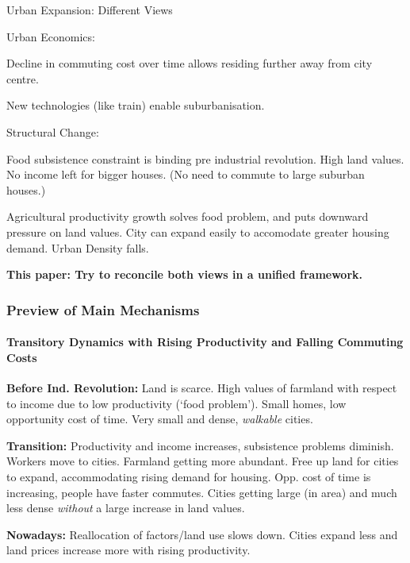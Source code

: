 \documentclass[aspectratio=169]{beamer}
\begin{document}
\begin{frame}{Urban Expansion: Different Views}

\begin{widee}

\item Urban Economics:
\begin{midi}
\item Decline in commuting cost over time allows residing further away from city centre.
\item New technologies (like train) enable suburbanisation.
\end{midi}

\pause

\item Structural Change: 
\begin{midi}
\item Food subsistence constraint is binding pre industrial revolution. High land values. No income left for bigger houses. (No need to commute to large suburban houses.)
\item Agricultural productivity growth solves food problem, and puts downward pressure on land values. City can expand easily to accomodate greater housing demand. Urban Density falls.
\end{midi}
\end{widee}

\pause

\begin{center}
	\textbf{This paper: Try to reconcile both views in a unified framework.}
\end{center}

\end{frame}

\begin{v75mins}
\begin{frame}
\frametitle{Preview of Main Mechanisms}
\framesubtitle{Transitory Dynamics with Rising Productivity and Falling Commuting Costs}

\begin{widei}
\item<1-> \textbf{Before Ind. Revolution:} Land is scarce. High values of farmland with respect to income due to low productivity (`food problem'). Small homes, low opportunity cost of time. Very small and dense, \emph{walkable} cities.
\item<2-> \textbf{Transition:} Productivity and income increases, subsistence problems diminish. Workers move to cities. Farmland getting more abundant. Free up land for cities to expand, accommodating rising demand for housing. Opp. cost of time is increasing, people have faster commutes. Cities getting large (in area) and much less dense \emph{without} a large increase in land values.
\item<3-> \textbf{Nowadays:} Reallocation of factors/land use slows down. Cities expand less and land prices increase more with rising productivity.
\end{widei}
\end{frame}
\end{v75mins}
\end{document}
